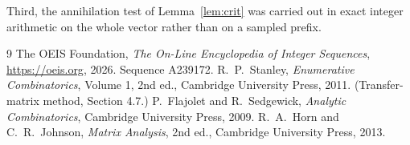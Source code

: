 \documentclass[11pt,a4paper]{article}
\theoremstyle{plain}
\theoremstyle{definition}
\begin{document}
Third, the annihilation test of Lemma~\ref{lem:crit} was carried out in exact integer
arithmetic on the whole vector rather than on a sampled prefix.

\begin{thebibliography}{9}
 The OEIS Foundation, \emph{The On-Line Encyclopedia of Integer
Sequences}, \url{https://oeis.org}, 2026. Sequence A239172.
 R.~P.~Stanley, \emph{Enumerative Combinatorics}, Volume 1, 2nd ed.,
Cambridge University Press, 2011. (Transfer-matrix method, Section 4.7.)
 P.~Flajolet and R.~Sedgewick, \emph{Analytic Combinatorics}, Cambridge
University Press, 2009.
 R.~A.~Horn and C.~R.~Johnson, \emph{Matrix Analysis}, 2nd ed., Cambridge
University Press, 2013.
\end{thebibliography}
\end{document}
